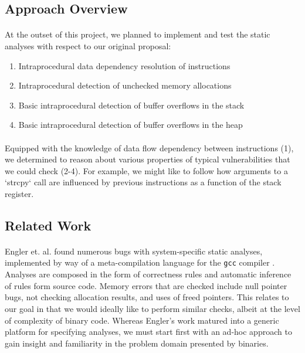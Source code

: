 \documentclass[letterpaper,11pt]{article}
\begin{document}
\subsection{Approach Overview}
\label{approachoverview}

\paragraph{}
At the outset of this project, we planned to implement and test the static
analyses with respect to our original proposal:

\begin{enumerate}
  \item Intraprocedural data dependency resolution of instructions
  \item Intraprocedural detection of unchecked memory allocations
  \item Basic intraprocedural detection of buffer overflows in the stack
  \item Basic intraprocedural detection of buffer overflows in the heap
\end{enumerate}

\paragraph{}
Equipped with the knowledge of data flow dependency between instructions (1),
we determined to reason about various properties of typical vulnerabilities
that we could check (2-4). For example, we might like to follow how arguments
to a `strcpy` call are influenced by previous instructions as a function of
the stack register.

\subsection{Related Work}

\paragraph{}
Engler et. al. found numerous bugs with system-specific static analyses,
implemented by way of a meta-compilation language for the \texttt{gcc} compiler
\cite{dawson, dawson2}. Analyses are composed in the form of correctness rules
and automatic inference of rules form source code. Memory errors that are
checked include null pointer bugs, not checking allocation results, and uses of
freed pointers. This relates to our goal in that we would ideally like to perform
similar checks, albeit at the level of complexity of binary code. Whereas
Engler's work matured into a generic platform for specifying analyses, we must
start first with an ad-hoc approach to gain insight and familiarity in the
problem domain presented by binaries.
\end{document}
